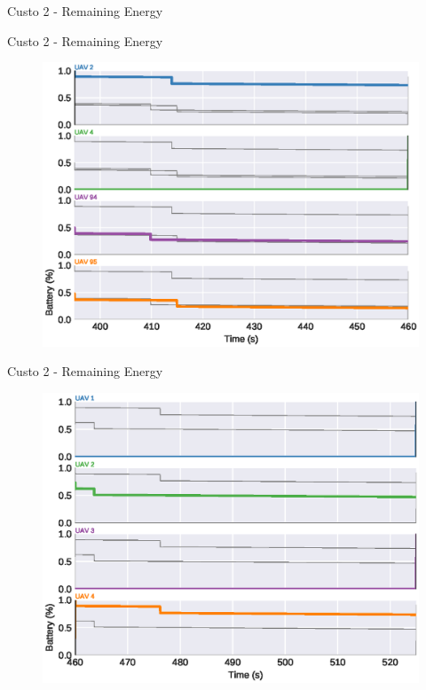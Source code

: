 \begin{frame}{Custo 2 - Remaining Energy}
\begin{figure}[!htb]
                    \end{figure}
                \end{frame}\begin{frame}{Custo 2 - Remaining Energy}
                    \begin{figure}[!htb]
                        \includegraphics[width=\textwidth]{custo_2/uav_remaining_energy_460.eps}
                    \end{figure}
                \end{frame}\begin{frame}{Custo 2 - Remaining Energy}
                    \begin{figure}[!htb]
                        \includegraphics[width=\textwidth]{custo_2/uav_remaining_energy_525.eps}

\end{figure}
\end{frame}
